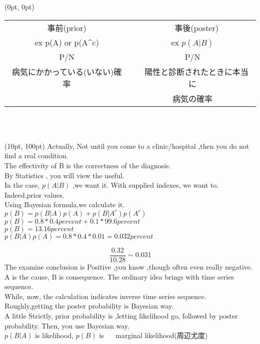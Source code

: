 \documentclass[dvipdfmx,cjk]{beamer} %
\theoremstyle{example}
\begin{document}
\begin{frame}
\begin{textblock*}{1\linewidth}(0pt, 0pt)
\begin{table}[]
    \centering
    \begin{tabular}{c|c}
        事前(prior) &　事後(poster)  \\
    ex p(A) or p(A^c)  &ex $p(A|B)$\\
       P/N  & P/N \\
       病気にかかっている(いない)確率&　陽性と診断されたときに本当に\\
        & 病気の確率
       
    \end{tabular}
    
    \label{tab:my_label}
\end{table}

\end{textblock*}
  \\
  \\
  \begin{textblock*}{1\linewidth}(10pt, 100pt)
  Actually, Not until you come to a clinic/hospital ,then you do not find a real condition.\\
  The effectivity of B is the correctness of the diagnosis.\\
  By Statistics , you will view the useful.\\
  In the case, $p(A|B)$ ,we want it.
  With supplied indexes, we want to.
  Indeed,prior values.
  \\
  Using Bayesian formula,we calculate it.\\
  $p(B)=p(B|A)p(A)+p(B|A^c)p(A^c)$\\
  $p(B)=0.8*0.4 percent + 0.1 * 99.6 percent$\\
  $p(B)=13.16percent$\\
  $p(B|A)p(A)=0.8 * 0.4 * 0.01= 0.032percent$
  
  
  
  
  
  \end{textblock*}
\end{frame}
\begin{frame}
$$\displaystyle \frac{0.32}{10.28}\sim 0.031$$
The examine conclusion is Positive ,you know ,though often even really negative. \\
A is the cause, B is consequence.
The ordinary idea brings with time series sequence.\\
While, now, the calculation indicates inverse time series sequence. \\
Roughly,getting the poster probability is Bayesian way.\\
A little Strictly, prior probability is ,letting likelihood go, followed by poster probability. Then, you use Bayesian way.\\
$p(B|A)$ is likelihood, $p(B)$ is 　
marginal likelihood(周辺尤度)

\end{frame}
\end{document}
